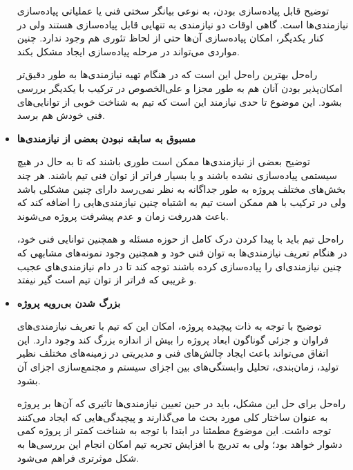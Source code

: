 \begin{itemize}
		توضیح \hspace*{1cm}  
	قابل پیاده‌سازی بودن، به نوعی بیانگر سختی فنی یا عملیاتی پیاده‌سازی نیازمندی‌ها است. گاهی اوقات دو نیازمندی به تنهایی قابل پیاده‌سازی هستند ولی در کنار یکدیگر، امکان پیاده‌سازی آن‌ها حتی از لحاظ تئوری هم وجود ندارد. چنین مواردی می‌تواند در مرحله پیاده‌سازی ایجاد مشکل بکند.
	
	راه‌حل \hspace*{1cm}  
	بهترین راه‌حل این است که در هنگام تهیه نیازمندی‌ها به طور دقیق‌تر امکان‌پذیر بودن آنان هم به طور مجزا و علی‌الخصوص در ترکیب با یکدیگر بررسی بشود. این موضوع تا حدی نیازمند این است که تیم به شناخت خوبی از توانایی‌های فنی خودش هم برسد.
	
	
	
	\item 
	\textbf{مسبوق به سابقه نبودن بعضی از نیازمندی‌ها}
	
		توضیح \hspace*{1cm}  
بعضی از نیازمندی‌ها ممکن است طوری باشند که تا به حال در هیچ سیستمی پیاده‌سازی نشده باشند و یا بسیار فراتر از توان فنی تیم باشند. هر چند بخش‌های مختلف پروژه به طور جداگانه به نظر نمی‌رسد دارای چنین مشکلی باشد ولی در ترکیب با هم ممکن است تیم به اشتباه چنین نیازمندی‌هایی را اضافه کند که باعث هدررفت زمان و عدم پیشرفت پروژه می‌شوند.

راه‌حل \hspace*{1cm}  
تیم باید با پیدا کردن درک کامل از حوزه مسئله و همچنین توانایی فنی خود، در هنگام تعریف نیازمندی‌ها به توان فنی خود و همچنین وجود نمونه‌های مشابهی که چنین نیازمندی‌‌ای را پیاده‌سازی کرده باشند توجه کند تا در دام نیازمندی‌های عجیب و غریبی که فراتر از توان تیم است گیر نیفتد.
	
	
	\item 
\textbf{بزرگ شدن بی‌رویه پروژه}

توضیح \hspace*{1cm}  
با توجه به ذات پیچیده پروژه، امکان این که تیم با تعریف نیازمندی‌های فراوان و جزئی گوناگون ابعاد پروژه را بیش‌ از اندازه بزرگ کند وجود دارد. این اتفاق می‌تواند باعث ایجاد چالش‌های فنی و مدیریتی در زمینه‌های مختلف نظیر تولید، زمان‌بندی، تحلیل وابستگی‌های بین اجزای سیستم و مجتمع‌سازی اجزای آن بشود.


راه‌حل \hspace*{1cm} 
برای حل این مشکل، باید در حین تعیین نیازمندی‌ها تاثیری که آن‌ها بر پروژه به عنوان ساختار کلی مورد بحث ما می‌گذارند و پیچیدگی‌هایی که ایجاد می‌کنند توجه داشت. این موضوع مطمئنا در ابتدا با توجه به شناخت‌ کمتر از پروژه کمی دشوار خواهد بود؛ ولی به تدریج با  افزایش تجربه تیم امکان انجام این بررسی‌ها به شکل موثر‌تری فراهم می‌شود.


	
\end{itemize}

